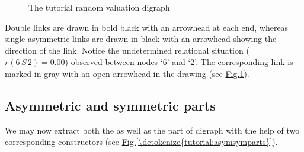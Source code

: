 \documentclass[a4paper,12pt,english]{sphinxhowto}
\let\sphinxpxdimen\pdfpxdimen\else\newdimen\sphinxpxdimen
\begin{document}
\begin{sphinxVerbatim}[commandchars=\\\{\},numbers=left,firstnumber=1,stepnumber=1]
\end{sphinxVerbatim}

\begin{figure}[H]
\centering
\capstart

\noindent\sphinxincludegraphics[width=300\sphinxpxdimen]{{tutRandValDigraph}.png}
\caption{The tutorial random valuation digraph}\label{\detokenize{tutorial:tutorialvaldigraph}}\end{figure}

Double links are drawn in bold black with an arrowhead at each end, whereas single asymmetric links are drawn in black with an arrowhead showing the direction of the link. Notice the undetermined relational situation (\(r(6\,S\,2) = 0.00\)) observed between nodes ‘6’ and ‘2’. The corresponding link is marked in gray with an open arrowhead in the drawing (see \hyperref[\detokenize{tutorial:tutorialvaldigraph}]{Fig.\@ \ref{\detokenize{tutorial:tutorialvaldigraph}}}).


\subsection{Asymmetric and symmetric parts}
\label{\detokenize{tutorial:asymmetric-and-symmetric-parts}}
We may now extract both the  as well as the  part of digraph  with the help of two corresponding constructors (see \hyperref[\detokenize{tutorial:asymsymparts}]{Fig.\@ \ref{\detokenize{tutorial:asymsymparts}}}).

\begin{sphinxVerbatim}[commandchars=\\\{\},numbers=left,firstnumber=1,stepnumber=1]
   
  
  
\end{sphinxVerbatim}
\end{document}
